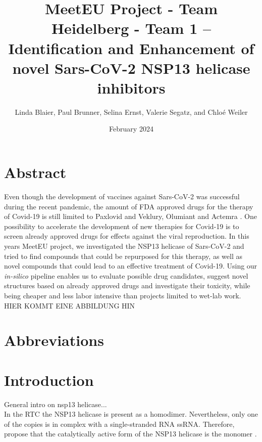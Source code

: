 \documentclass[11pt, letterpaper, titlepage]{article}
\title{MeetEU Project - Team Heidelberg - Team 1 -- \\ Identification and Enhancement of novel Sars-CoV-2 NSP13 helicase inhibitors}
\author{Linda Blaier, Paul Brunner, Selina Ernst, Valerie Segatz, and Chlo\'{e} Weiler}
\date{February 2024}
\renewcommand{\cite}{\parencite}
\begin{document}
\maketitle

\ihead{\headmark}
\cfoot{\pagemark}   %

\section{Abstract}
Even though the development of vaccines against Sars-CoV-2 was successful during the recent pandemic, the amount of FDA approved drugs for the therapy of Covid-19 is still limited to Paxlovid and Veklury, Olumiant and Actemra \cite{FDA_COVID}. One possibility to accelerate the development of new therapies for Covid-19 is to screen already approved drugs for effects against the viral reproduction. In this years MeetEU project, we investigated the NSP13 helicase of Sars-CoV-2 and tried to find compounds that could be repurposed for this therapy, as well as novel compounds that could lead to an effective treatment of Covid-19. Using our \textit{in-silico} pipeline enables us to evaluate possible drug candidates, suggest novel structures based on already approved drugs and investigate their toxicity, while being cheaper and less labor intensive than projects limited to wet-lab work. 
HIER KOMMT EINE ABBILDUNG HIN


\FloatBarrier

\newpage
{\setlength{\parskip}{0.2cm}
\section*{Abbreviations}
    \begin{acronym}[LC-MS/MS23]
        
        
        
        
        
    \end{acronym}
}
\newpage

\section{Introduction}
General intro on nsp13 helicase... \\
In the \ac{RTC} the NSP13 helicase is present as a homodimer. Nevertheless, only one of the copies is in complex with a single-stranded RNA \ac{ssRNA}. Therefore, \textcite{Berta_2021} propose that the catalytically active form of the NSP13 helicase is the monomer \cite{Berta_2021}.  
\end{document}
